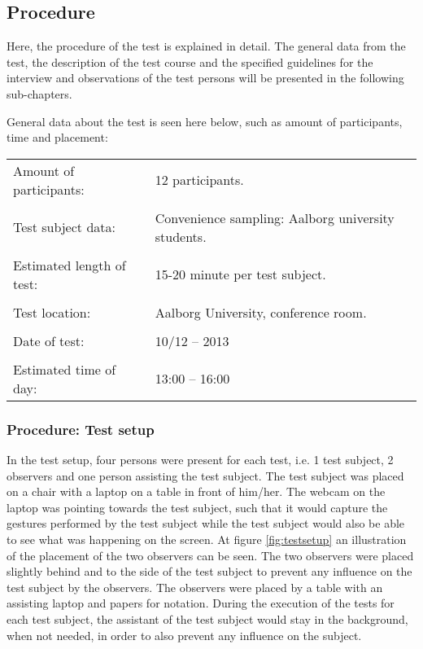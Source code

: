 \subsection{Procedure}
Here, the procedure of the test is explained in detail. 
The general data from the test, the description of the test course and the specified guidelines for the interview and observations of the test persons will be presented in the following sub-chapters.


General data about the test is seen here below, such as amount of participants, time and placement:
\begin{table}[!htb]
\begin{tabular}{l l}
Amount of participants: & 12 participants.\\
 & \\
Test subject data: & Convenience sampling: Aalborg university students.\\
 & \\
Estimated length of test: & 15-20 minute per test subject.\\
 & \\
Test location: & Aalborg University, conference room.\\
 & \\
Date of test: & 10/12 – 2013\\
 & \\
Estimated time of day: & 13:00 – 16:00\\
\end{tabular}
\end{table}


\subsubsection{Procedure: Test setup}
In the test setup, four persons were present for each test, i.e. 1 test subject, 2 observers and one person assisting the test subject. 
The test subject was placed on a chair with a laptop on a table in front of him/her. 
The webcam on the laptop was pointing towards the test subject, such that it would capture the gestures performed by the test subject while the test subject would also be able to see what was happening on the screen. 
At figure \ref{fig:testsetup} an illustration of the placement of the two observers can be seen. The two observers were placed slightly behind and to the side of the test subject to prevent any influence on the test subject by the observers. 
The observers were placed by a table with an assisting laptop and papers for notation. 
During the execution of the tests for each test subject, the assistant of the test subject would stay in the background, when not needed, in order to also prevent any influence on the subject.

